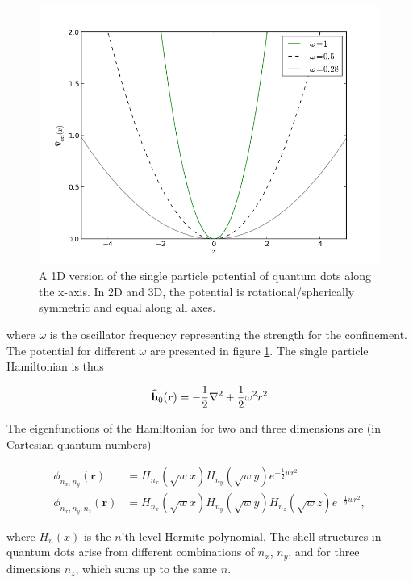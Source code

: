 \begin{figure}
 \begin{center}
  \includegraphics[scale=0.5]{../Graphics/Potentials/qdots.png}
  \caption{A 1D version of the single particle potential of quantum dots along the x-axis. In 2D and 3D, the potential is rotational/spherically symmetric and equal along all axes.}
  \label{fig:extPotQDOTS}
 \end{center}
\end{figure}

where $\omega$ is the oscillator frequency representing the strength for the confinement. The potential for different $\omega$ are presented in figure \ref{fig:extPotQDOTS}. The single particle Hamiltonian is thus

\begin{equation}
 {\bf\widehat{h}}_0(\mathbf{r}) = -\frac{1}{2}\nabla^2 + \frac{1}{2}\omega^2r^2
\end{equation}

The eigenfunctions of the Hamiltonian for two and three dimensions are (in Cartesian quantum numbers)

\begin{align}
\phi_{n_x, n_y}(\mathbf{r}) &= H_{n_x}(\sqrt{w}x)H_{n_y}(\sqrt{w}y)e^{-\frac{1}{2}wr^2} \\
\phi_{n_x, n_y, n_z}(\mathbf{r}) &= H_{n_x}(\sqrt{w}x)H_{n_y}(\sqrt{w}y)H_{n_z}(\sqrt{w}z)e^{-\frac{1}{2}wr^2},
\end{align}

where $H_n(x)$ is the $n$'th level Hermite polynomial. The shell structures in quantum dots arise from different combinations of $n_x$, $n_y$, and for three dimensions $n_z$, which sums up to the same $n$.

